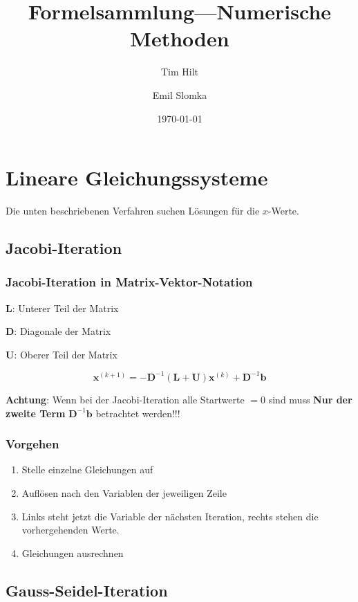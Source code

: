 \documentclass[a4paper, twoside]{article}
\title{Formelsammlung---Numerische Methoden}
\author{Tim Hilt \and Emil Slomka}
\date{\today}
\begin{document}
\maketitle
\tableofcontents

\section{Lineare Gleichungssysteme}

Die unten beschriebenen Verfahren suchen Lösungen für die $x$-Werte. 

\subsection{Jacobi-Iteration}

\subsubsection{Jacobi-Iteration in Matrix-Vektor-Notation}

$\mathbf{L}$: Unterer Teil der Matrix

$\mathbf{D}$: Diagonale der Matrix

$\mathbf{U}$: Oberer Teil der Matrix

\[\mathbf{x}^{(k+1)} = -\mathbf{D}^{-1} (\mathbf{L} + \mathbf{U})\mathbf{x}^{(k)} + \mathbf{D}^{-1}\mathbf{b}\]

\textbf{Achtung}: Wenn bei der Jacobi-Iteration alle Startwerte $=0$ sind muss \textbf{Nur der zweite Term} $\mathbf{D}^{-1}\mathbf{b}$ betrachtet werden!!!

\subsubsection{Vorgehen}

\begin{enumerate}
\item Stelle einzelne Gleichungen auf
\item Auflösen nach den Variablen der jeweiligen Zeile
\item Links steht jetzt die Variable der nächsten Iteration, rechts stehen die vorhergehenden Werte.
\item Gleichungen ausrechnen
\end{enumerate}

\subsection{Gauss-Seidel-Iteration}
\end{document}
